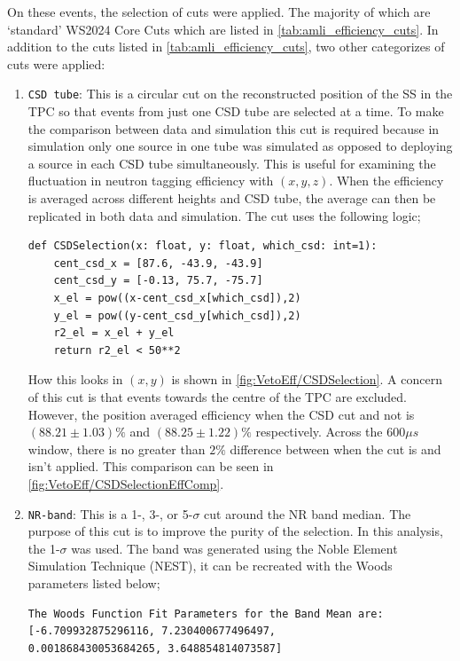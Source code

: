On these events, the selection of cuts were applied.
The majority of which are `standard' WS2024 Core Cuts which are listed in \autoref{tab:amli_efficiency_cuts}.
In addition to the cuts listed in \autoref{tab:amli_efficiency_cuts}, two other categorizes of cuts were applied:
\begin{enumerate}
	\item \lstinline{CSD tube}: This is a circular cut on the reconstructed position of the SS in the TPC so that events from just one CSD tube are selected at a time.
	To make the comparison between data and simulation this cut is required because in simulation only one source in one tube was simulated as opposed to deploying a source in each CSD tube simultaneously.
	This is useful for examining the fluctuation in neutron tagging efficiency with $(x,y,z)$.
	When the efficiency is averaged across different heights and CSD tube, the average can then be replicated in both data and simulation. The cut uses the following logic;
\begin{lstlisting}[backgroundcolor=\color{lightgray},langauge=Python]
def CSDSelection(x: float, y: float, which_csd: int=1):
    cent_csd_x = [87.6, -43.9, -43.9]
    cent_csd_y = [-0.13, 75.7, -75.7]
    x_el = pow((x-cent_csd_x[which_csd]),2)
    y_el = pow((y-cent_csd_y[which_csd]),2)
    r2_el = x_el + y_el
    return r2_el < 50**2
\end{lstlisting}
	      How this looks in $(x,y)$ is shown in \autoref{fig:VetoEff/CSDSelection}.
	      A concern of this cut is that events towards the centre of the TPC are excluded.
	      However, the position averaged efficiency when the CSD cut and not is $(88.21\pm1.03)\%$ and  $(88.25\pm1.22)\%$ respectively.
	      Across the $600\mu s$ window, there is no greater than $2\%$ difference between when the cut is and isn't applied.
	      This comparison can be seen in \autoref{fig:VetoEff/CSDSelectionEffComp}.
	\item \lstinline{NR-band}: This is a 1-, 3-, or 5-$\sigma$ cut around the NR band median.
	      The purpose of this cut is to improve the purity of the selection.
	      In this analysis, the 1-$\sigma$ was used.
		  The band was generated using the Noble Element Simulation Technique (NEST), it can be recreated with the Woods parameters listed below;
\begin{lstlisting}[backgroundcolor = \color{lightgray}]
The Woods Function Fit Parameters for the Band Mean are:
[-6.709932875296116, 7.230400677496497,
0.001868430053684265, 3.648854814073587]


\end{lstlisting}
\end{enumerate}
